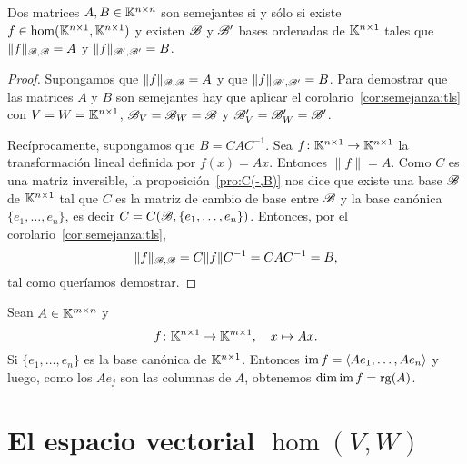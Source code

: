 \begin{cor}
    \label{cor:semejanza}
    Dos matrices $A,B\in\mathbb{K}^{n\times n}$ son semejantes si y sólo si existe
    $f\in\hom(\mathbb{K}^{n\times1},\mathbb{K}^{n\times1})$ y existen $\mathscr{B}$ y $\mathscr{B}'$ bases ordenadas de 
    $\mathbb{K}^{n\times1}$ tales que $\|f\|_{\mathscr{B},\mathscr{B}}=A$ y $\|f\|_{\mathscr{B}',\mathscr{B}'}=B$.

    \begin{proof}
        Supongamos que $\|f\|_{\mathscr{B},\mathscr{B}}=A$ y que $\|f\|_{\mathscr{B}',\mathscr{B}'}=B$. Para
        demostrar que las matrices $A$ y $B$ son semejantes hay que aplicar el
        corolario~\ref{cor:semejanza:tls} con $V=W=\mathbb{K}^{n\times1}$,
        $\mathscr{B}_V=\mathscr{B}_W=\mathscr{B}$ y $\mathscr{B}_V'=\mathscr{B}_W'=\mathscr{B}'$. 

		Recíprocamente, supongamos que $B=CAC^{-1}$. Sea
		$f\colon\mathbb{K}^{n\times1}\to\mathbb{K}^{n\times1}$ la transformación lineal
		definida por $f(x)=Ax$. Entonces $\|f\|=A$.  Como $C$ es una matriz
		inversible, la proposición~\ref{pro:C(-,B)} nos dice que existe una
		base $\mathscr{B}$ de $\mathbb{K}^{n\times1}$ tal que $C$ es la matriz de cambio de
		base entre $\mathscr{B}$ y la base canónica $\{e_1,\dots,e_n\}$, es decir
		$C=C(\mathscr{B},\{e_1,\dots,e_n\})$. 
		Entonces, por el corolario~\ref{cor:semejanza:tls},
		\[
		\|f\|_{\mathscr{B},\mathscr{B}}=C\|f\|C^{-1}=CAC^{-1}=B,
		\]
		tal como queríamos demostrar.
    \end{proof}
\end{cor}

\begin{remark}
    Sean $A\in\mathbb{K}^{m\times n}$ y \[
	f\colon\mathbb{K}^{n\times1}\to\mathbb{K}^{m\times1},
	\quad
	x\mapsto Ax.
	\]
	Si $\{e_1,\dots,e_n\}$ es la base
    canónica de $\mathbb{K}^{n\times1}$. Entonces $\operatorname{im} f=\langle
	Ae_1,\dots,Ae_n\rangle$ y luego, como los $Ae_j$ son las columnas de 
	$A$, obtenemos $\dim\operatorname{im} f=\operatorname{rg}(A)$. 
\end{remark}

\section{El espacio vectorial $\hom(V,W)$}

